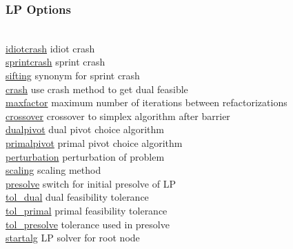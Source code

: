\subsubsection{LP Options}
\begin{tabbing}
\hspace {1.3in} \= \\
\hyperlink{idiotcrash}
{idiotcrash} \> idiot crash \\
\hyperlink{sprintcrash}
{sprintcrash} \> sprint crash \\
\hyperlink{sifting}
{sifting} \> synonym for sprint crash \\
\hyperlink{crash}
{crash} \> use crash method to get dual feasible \\
\hyperlink{maxfactor}
{maxfactor} \> maximum number of iterations between refactorizations \\
\hyperlink{crossover}
{crossover} \> crossover to simplex algorithm after barrier \\
\hyperlink{dualpivot}
{dualpivot} \> dual pivot choice algorithm \\
\hyperlink{primalpivot}
{primalpivot} \> primal pivot choice algorithm \\
\hyperlink{perturbation}
{perturbation} \> perturbation of problem \\
\hyperlink{scaling}
{scaling} \> scaling method \\
\hyperlink{presolve}
{presolve} \> switch for initial presolve of LP \\
\hyperlink{tol_dual}
{tol\_dual} \> dual feasibility tolerance \\
\hyperlink{tol_primal}
{tol\_primal} \> primal feasibility tolerance \\
\hyperlink{tol_presolve}
{tol\_presolve} \> tolerance used in presolve \\
\hyperlink{startalg}
{startalg} \> LP solver for root node
\end{tabbing}


